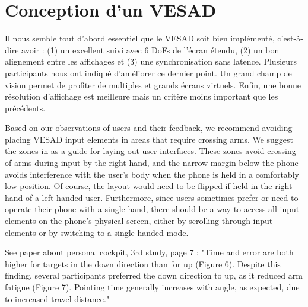 

\section{Conception d'un VESAD}
\label{sec:discussion_consequences}

Il nous semble tout d'abord essentiel que le VESAD soit bien implémenté, c'est-à-dire avoir : (1) un excellent suivi avec 6 DoFs de l'écran étendu, (2) un bon alignement entre les affichages et (3) une synchronisation sans latence. Plusieurs participants nous ont indiqué d'améliorer ce dernier point. Un grand champ de vision permet de profiter de multiples et grands écrans virtuels. Enfin, une bonne résolution d'affichage est meilleure mais un critère moins important que les précédents.

Based on our observations of users and their feedback, we recommend avoiding placing VESAD input elements in areas that require crossing arms. We suggest the zones in  as a guide for laying out user interfaces. These zones avoid crossing of arms during input by the right hand, and the narrow margin below the phone avoids interference with the user's body when the phone is held in a comfortably low position. Of course, the layout would need to be flipped if held in the right hand of a left-handed user. Furthermore, since users sometimes prefer or need to operate their phone with a single hand, there should be a way to access all input elements on the phone's physical screen, either by scrolling through input elements or by switching to a single-handed mode.



See paper about personal cockpit, 3rd study, page 7 : "Time and error are both higher for targets in the down direction than for up (Figure 6). Despite this finding, several participants preferred the down direction to up, as it reduced arm fatigue (Figure 7). Pointing time generally increases with angle, as expected, due to increased travel distance."

